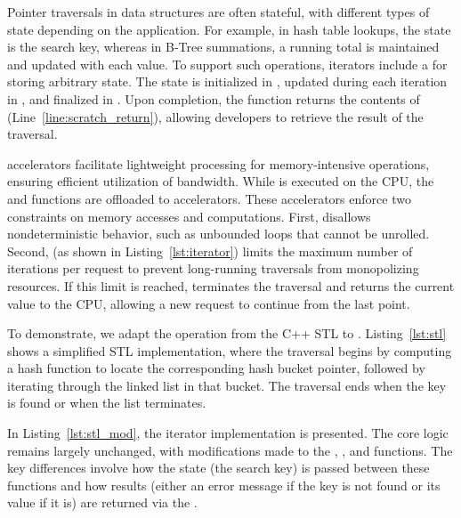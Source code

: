   
  
 Pointer traversals in data structures are often stateful, with different types of state depending on the application. For example, in hash table lookups, the state is the search key, whereas in B-Tree summations, a running total is maintained and updated with each value. To support such operations, \pulse iterators include a  for storing arbitrary state. The state is initialized in , updated during each iteration in , and finalized in . Upon completion, the  function returns the contents of  (Line~\ref{line:scratch_return}), allowing developers to retrieve the result of the traversal.

 \pulse accelerators facilitate lightweight processing for memory-intensive operations, ensuring efficient utilization of bandwidth. While  is executed on the CPU, the  and  functions are offloaded to \pulse accelerators. These accelerators enforce two constraints on memory accesses and computations. First, \pulse disallows nondeterministic behavior, such as unbounded loops that cannot be unrolled. Second,  (as shown in Listing~\ref{lst:iterator}) limits the maximum number of iterations per request to prevent long-running traversals from monopolizing resources. If this limit is reached, \pulse terminates the traversal and returns the current  value to the CPU, allowing a new request to continue from the last point.

 To demonstrate, we adapt the  operation from the C++ STL  to \pulse. Listing~\ref{lst:stl} shows a simplified STL implementation, where the traversal begins by computing a hash function to locate the corresponding hash bucket pointer, followed by iterating through the linked list in that bucket. The traversal ends when the key is found or when the list terminates.

In Listing~\ref{lst:stl_mod}, the \pulse iterator implementation is presented. The core logic remains largely unchanged, with modifications made to the , , and  functions. The key differences involve how the state (the search key) is passed between these functions and how results (either an error message if the key is not found or its value if it is) are returned via the .

